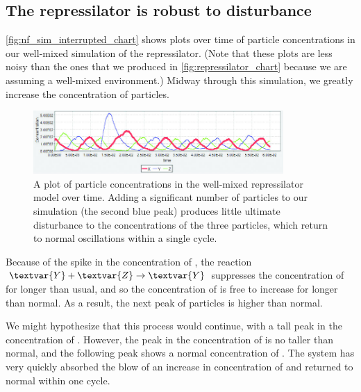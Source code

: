 \subsection{The repressilator is robust to disturbance}

\autoref{fig:nf_sim_interrupted_chart} shows plots over time of particle concentrations in our well-mixed simulation of the repressilator. (Note that these plots are less noisy than the ones that we produced in \autoref{fig:repressilator_chart} because we are assuming a well-mixed environment.) Midway through this simulation, we greatly increase the concentration of  particles.

\begin{figure}[h]
\centering
\mySfFamily
\includegraphics[width = 0.85\textwidth]{../images_CMYK/nf_sim_interrupted_chart_spike}
\caption{A plot of particle concentrations in the well-mixed repressilator model over time. Adding a significant number of  particles to our simulation (the second blue peak) produces little ultimate disturbance to the concentrations of the three particles, which return to normal oscillations within a single cycle.}
\label{fig:nf_sim_interrupted_chart}
\end{figure}

Because of the spike in the concentration of , the reaction $\textvar{Y} + \textvar{Z} \rightarrow \textvar{Y}$ suppresses the concentration of  for longer than usual, and so the concentration of  is free to increase for longer than normal. As a result, the next peak of  particles is higher than normal.

We might hypothesize that this process would continue, with a tall peak in the concentration of . However, the peak in the concentration of  is no taller than normal, and the following peak shows a normal concentration of . The system has very quickly absorbed the blow of an increase in concentration of  and returned to normal within one cycle.

%

